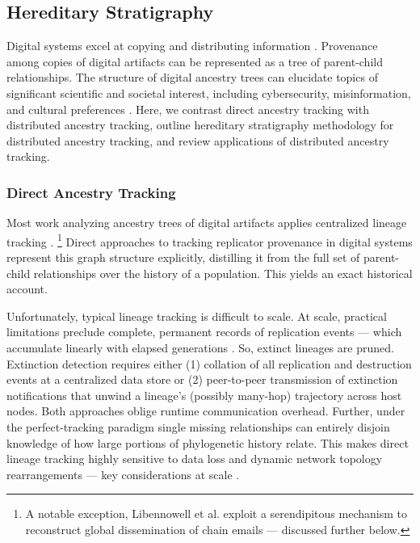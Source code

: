 \subsection{Hereditary Stratigraphy} \label{sec:hereditary-stratigraphy}

Digital systems excel at copying and distributing information \citep{miller2001taking}.
Provenance among copies of digital artifacts can be represented as a tree of parent-child relationships.
The structure of digital ancestry trees can elucidate topics of significant scientific and societal interest, including cybersecurity, misinformation, and cultural preferences \citep{aslan2020comprehensive,dupuis2019spread,ling2021dissecting}.
Here, we contrast direct ancestry tracking with distributed ancestry tracking, outline hereditary stratigraphy methodology for distributed ancestry tracking, and review applications of distributed ancestry tracking.

\subsubsection{Direct Ancestry Tracking}

Most work analyzing ancestry trees of digital artifacts applies centralized lineage tracking \citep{friggeri2014rumor,cohen1987computer,dolson2023phylotrackpy}.%
\footnote{A notable exception, Libennowell et al. exploit a serendipitous mechanism to reconstruct global dissemination of chain emails --- discussed further below.}
Direct approaches to tracking replicator provenance in digital systems represent this graph structure explicitly, distilling it from the full set of parent-child relationships over the history of a population.
This yields an exact historical account.

Unfortunately, typical lineage tracking is difficult to scale.
At scale, practical limitations preclude complete, permanent records of replication events --- which accumulate linearly with elapsed generations \citep{dolson2023algorithms}.
So, extinct lineages are pruned.
Extinction detection requires either (1) collation of all replication and destruction events at a centralized data store or (2) peer-to-peer transmission of extinction notifications that unwind a lineage's (possibly many-hop) trajectory across host nodes.
Both approaches oblige runtime communication overhead.
Further, under the perfect-tracking paradigm single missing relationships can entirely disjoin knowledge of how large portions of phylogenetic history relate.
This makes direct lineage tracking highly sensitive to data loss and dynamic network topology rearrangements --- key considerations at scale \citep{cappello2014toward,ackley2011pursue}.

